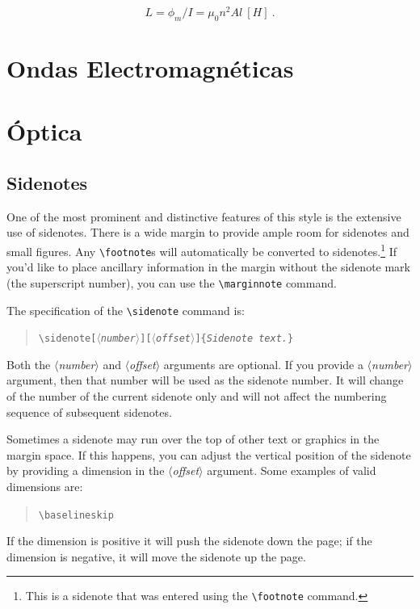 \documentclass{tufte-handout}
\newcommand{\doccmd}[1]{\texttt{\textbackslash#1}}%
\newcommand{\docopt}[1]{\ensuremath{\langle}\textrm{\textit{#1}}\ensuremath{\rangle}}%
\newcommand{\docarg}[1]{\textrm{\textit{#1}}}%
\newenvironment{docspec}{\begin{quote}\noindent}{\end{quote}}%
\begin{document}
\begin{equation}
L = \phi_m / I = \mu_0 n^2 Al~[H]~.
\end{equation}


\clearpage

\section{Ondas Electromagnéticas}

\clearpage

\section{Óptica}

\clearpage

\subsection{Sidenotes}\label{sec:sidenotes}
One of the most prominent and distinctive features of this style is the
extensive use of sidenotes.  There is a wide margin to provide ample room
for sidenotes and small figures.  Any \Verb|\footnote|s will automatically
be converted to sidenotes.\footnote{This is a sidenote that was entered
using the \texttt{\textbackslash footnote} command.}  If you'd like to place ancillary
information in the margin without the sidenote mark (the superscript
number), you can use the \Verb|\marginnote| command.

The specification of the \Verb|\sidenote| command is:
\begin{docspec}
  \doccmd{sidenote[\docopt{number}][\docopt{offset}]\{\docarg{Sidenote text.}\}}
\end{docspec}

Both the \docopt{number} and \docopt{offset} arguments are optional.  If you
provide a \docopt{number} argument, then that number will be used as the
sidenote number.  It will change of the number of the current sidenote only and
will not affect the numbering sequence of subsequent sidenotes.

Sometimes a sidenote may run over the top of other text or graphics in the
margin space.  If this happens, you can adjust the vertical position of the
sidenote by providing a dimension in the \docopt{offset} argument.  Some
examples of valid dimensions are:
\begin{docspec}
  \ttfamily 1.0in \qquad 2.54cm \qquad 254mm \Verb|\baselineskip|
\end{docspec}
If the dimension is positive it will push the sidenote down the page; if the
dimension is negative, it will move the sidenote up the page.
\end{document}
